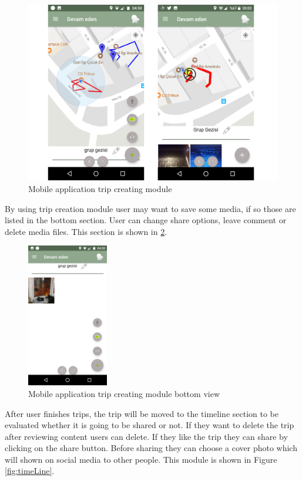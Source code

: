 \begin{figure}[!htbp]
\centering
\includegraphics[scale=0.35]{projectChapters/images/tripCreateSection.png}
\caption{Mobile application trip creating module}
\label{fig:tripCreateSection}
\end{figure}

By using trip creation module user may want to save some media, if so those are listed in the bottom section. User can change share options, leave comment or delete media files. This section is shown in \ref{fig:createdMedias}.

\begin{figure}[!htbp]
\centering
\includegraphics[height=17em]{projectChapters/images/createdMedias.png}
\caption{Mobile application trip creating module bottom view}
\label{fig:createdMedias}
\end{figure}

\newpage

After user finishes trips, the trip will be moved to the timeline section to be evaluated whether it is going to be shared or not. If they want to delete the trip after reviewing content users can delete. If they like the trip they can share by clicking on the share button. Before sharing they can choose a cover photo which will shown on social media to other people. This module is shown in Figure \ref{fig:timeLine}.

